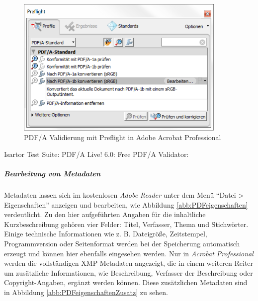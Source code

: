 \begin{figure}[h!tb]
  \begin{center}
    \includegraphics[width=0.9\textwidth]{bilder/PDF_preflight}
  \end{center}
  \caption{PDF/A Validierung mit Preflight in Adobe Acrobat Professional}
  \label{abb:PDFpreflight}
\end{figure}

\begin{flushleft}
	Isartor Test Suite: 
	PDF/A Live! 6.0: 
	Free PDF/A Validator: 
\end{flushleft}

\subparagraph{Bearbeitung von Metadaten}
Metadaten lassen sich im kostenlosen \emph{Adobe Reader} unter dem Menü "`Datei > Eigenschaften"' anzeigen und bearbeiten, wie Abbildung \ref{abb:PDFeigenschaften} verdeutlicht. Zu den hier aufgeführten Angaben für die inhaltliche Kurzbeschreibung gehören vier Felder: Titel, Verfasser, Thema und Stichwörter. Einige technische Informationen wie z. B. Dateigröße, Zeitstempel, Programmversion oder Seitenformat werden bei der Speicherung automatisch erzeugt und können hier ebenfalls eingesehen werden. Nur in \emph{Acrobat Professional} werden die vollständigen XMP Metadaten angezeigt, die in einem weiteren Reiter um zusätzliche Informationen, wie Beschreibung, Verfasser der Beschreibung oder Copyright-Angaben, ergänzt werden können. Diese zusätzlichen Metadaten sind in Abbildung \ref{abb:PDFeigenschaftenZusatz} zu sehen.


